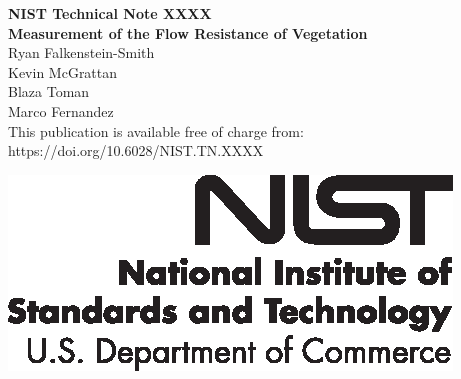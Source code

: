 \documentclass[12pt]{article}
\newcommand{\pubnumber}{XXXX}
\newcommand{\DOI}{https://doi.org/10.6028/NIST.TN.XXXX}
\begin{document}
\pagestyle{empty}

	\begin{titlepage}
		\begin{flushright}
\LARGE{\textbf{NIST Technical Note \pubnumber}}\\
\vfill
\Huge{\textbf{Measurement of the Flow Resistance of Vegetation}}\\
\vfill
\large Ryan Falkenstein-Smith\\
\large Kevin McGrattan\\
\large Blaza Toman\\
\large Marco Fernandez \\
\vfill
\normalsize This publication is available free of charge from:\\
\DOI\\
\vfill

\includegraphics[width=0.3\linewidth]{NIST-logo.eps}\\


\end{flushright}
\end{titlepage}
\end{document}
